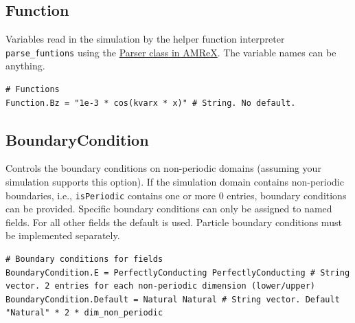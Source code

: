 \documentclass[11pt]{article}
\begin{document}
\subsection{Function}
Variables read in the simulation by the helper function interpreter \verb|parse_funtions| using the \href{https://amrex-codes.github.io/amrex/docs_html/Basics.html#parser}{Parser class in AMReX}. The variable names can be anything.
\begin{lstlisting}[language=pkgconfig]
# Functions
Function.Bz = "1e-3 * cos(kvarx * x)" # String. No default.
\end{lstlisting}

\subsection{BoundaryCondition}
Controls the boundary conditions on non-periodic domains (assuming your simulation supports this option). If the simulation domain contains non-periodic boundaries, i.e., \verb|isPeriodic| contains one or more 0 entries, boundary conditions can be provided. Specific boundary conditions can only be assigned to named fields. For all other fields the default is used.
Particle boundary conditions must be implemented separately.
\begin{lstlisting}[language=pkgconfig]
# Boundary conditions for fields
BoundaryCondition.E = PerfectlyConducting PerfectlyConducting # String vector. 2 entries for each non-periodic dimension (lower/upper)
BoundaryCondition.Default = Natural Natural # String vector. Default "Natural" * 2 * dim_non_periodic
\end{lstlisting}
\end{document}
